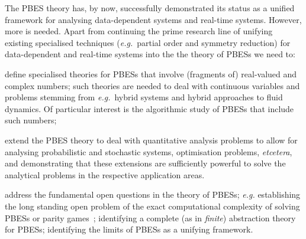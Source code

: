 \documentclass[sigplan,10pt,review]{acmart}\settopmatter{printfolios=true,printccs=false,printacmref=false}
\begin{document}
The PBES theory has, by now, successfully demonstrated its status as a unified
framework for analysing
data-dependent systems and real-time systems. However, more is needed.
Apart from continuing the prime research line of unifying existing specialised
techniques (\emph{e.g.}\ partial order and symmetry reduction) for data-dependent 
and real-time systems into the the theory of PBESs we need to:
\begin{compactitem}

\item define specialised theories for 
PBESs that involve (fragments of) real-valued and complex numbers; such theories are
needed to deal with continuous variables and problems stemming from \emph{e.g.}\
hybrid systems and hybrid approaches to fluid dynamics. Of particular interest
is the algorithmic study of PBESs that include such numbers;

\item extend the PBES theory to deal with quantitative analysis
problems to allow for analysing probabilistic and stochastic systems,
optimisation problems, \emph{etcetera}, and demonstrating that these extensions
are sufficiently powerful to solve the analytical problems in the
respective application areas.

\item address the fundamental open questions in the theory of PBESs;
\emph{e.g.} establishing the long standing open problem of the exact computational complexity of
solving PBESs or parity games~\cite{CaludeJKL017}; identifying a complete (as in
\emph{finite}) abstraction theory for PBESs; identifying the limits
of PBESs as a unifying framework.


\end{compactitem}
%











\end{document}
